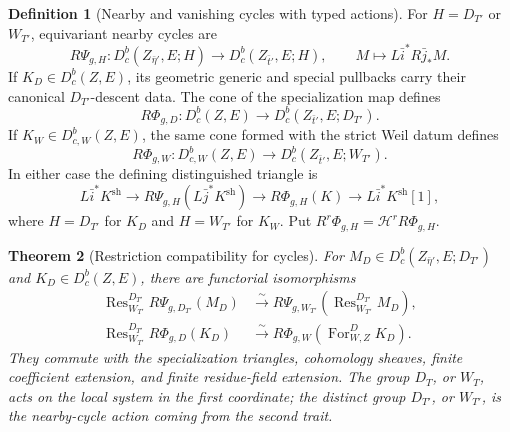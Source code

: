 \documentclass[10pt]{article}
\newtheorem{theorem}{Theorem}[section]
\theoremstyle{definition}
\newtheorem{definition}[theorem]{Definition}
\newcommand{\Dbc}{D^b_c}
\newcommand{\DbcW}{D^b_{c,W}}
\begin{document}
\begin{definition}[Nearby and vanishing cycles with typed actions]
For \(H=D_{T'}\) or \(W_{T'}\), equivariant nearby cycles are
\[
 R\Psi_{g,H}:\Dbc(Z_{\bar\eta'},E;H)
       \longrightarrow\Dbc(Z_{\bar t'},E;H),
 \qquad M\longmapsto L\bar i^*R\bar j_*M.
\]
If \(K_D\in\Dbc(Z,E)\), its geometric generic and special pullbacks carry
their canonical \(D_{T'}\)-descent data.  The cone of the specialization
map defines
\[
 R\Phi_{g,D}:\Dbc(Z,E)\longrightarrow
       \Dbc(Z_{\bar t'},E;D_{T'}).
\]
If \(K_W\in\DbcW(Z,E)\), the same cone formed with the strict Weil datum
defines
\[
 R\Phi_{g,W}:\DbcW(Z,E)\longrightarrow
       \Dbc(Z_{\bar t'},E;W_{T'}).
\]
In either case the defining distinguished triangle is
\[
 L\bar i^*K^{\mathrm{sh}}\longrightarrow
 R\Psi_{g,H}(L\bar j^*K^{\mathrm{sh}})\longrightarrow
 R\Phi_{g,H}(K)\longrightarrow L\bar i^*K^{\mathrm{sh}}[1],
\]
where \(H=D_{T'}\) for \(K_D\) and \(H=W_{T'}\) for \(K_W\).  Put
\(R^r\Phi_{g,H}=\mathcal H^rR\Phi_{g,H}\).
\end{definition}

\begin{theorem}[Restriction compatibility for cycles]
For \(M_D\in\Dbc(Z_{\bar\eta'},E;D_{T'})\) and
\(K_D\in\Dbc(Z,E)\), there are functorial isomorphisms
\[
 \begin{aligned}
 \operatorname{Res}^{D_{T'}}_{W_{T'}}R\Psi_{g,D_{T'}}(M_D)
   &\xrightarrow{\sim}
 R\Psi_{g,W_{T'}}\!\left(
   \operatorname{Res}^{D_{T'}}_{W_{T'}}M_D\right),\\
 \operatorname{Res}^{D_{T'}}_{W_{T'}}R\Phi_{g,D}(K_D)
   &\xrightarrow{\sim}
 R\Phi_{g,W}\!\left(\operatorname{For}^{D}_{W,Z}K_D\right).
 \end{aligned}
\]
They commute with the specialization triangles, cohomology sheaves, finite
coefficient extension, and finite residue-field extension.  The group
\(D_T\), or \(W_T\), acts on the local system in the first coordinate;
the distinct group \(D_{T'}\), or \(W_{T'}\), is the nearby-cycle action
coming from the second trait.
\end{theorem}
\end{document}
